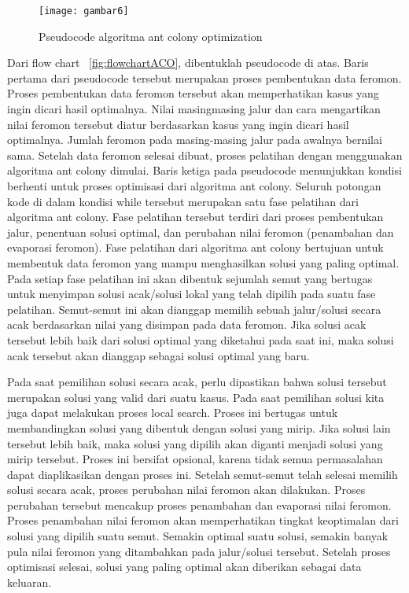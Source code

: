 \begin{itemize}
\begin{figure}[H]
	\centering
	\texttt{[image: gambar6]}
	\caption[Pseudocode ACO] {Pseudocode algoritma ant colony optimization}
	\label{fig:pseudocodeACO}
\end{figure}

Dari flow chart ~\ref{fig:flowchartACO}, dibentuklah pseudocode di atas. Baris pertama
dari pseudocode tersebut merupakan proses pembentukan data feromon. Proses pembentukan data
feromon tersebut akan memperhatikan kasus yang ingin dicari hasil optimalnya. Nilai masingmasing
jalur dan cara mengartikan nilai feromon tersebut diatur berdasarkan kasus yang ingin
dicari hasil optimalnya. Jumlah feromon pada masing-masing jalur pada awalnya bernilai sama.
Setelah data feromon selesai dibuat, proses pelatihan dengan menggunakan algoritma ant colony
dimulai. Baris ketiga pada pseudocode menunjukkan kondisi berhenti untuk proses optimisasi dari
algoritma ant colony. 
Seluruh potongan kode di dalam kondisi while tersebut merupakan satu fase
pelatihan dari algoritma ant colony. Fase pelatihan tersebut terdiri dari proses pembentukan jalur,
penentuan solusi optimal, dan perubahan nilai feromon (penambahan dan evaporasi feromon).
Fase pelatihan dari algoritma ant colony bertujuan untuk membentuk data feromon yang mampu
menghasilkan solusi yang paling optimal. Pada setiap fase pelatihan ini akan dibentuk sejumlah
semut yang bertugas untuk menyimpan solusi acak/solusi lokal yang telah dipilih pada suatu fase
pelatihan. Semut-semut ini akan dianggap memilih sebuah jalur/solusi secara acak berdasarkan
nilai yang disimpan pada data feromon. Jika solusi acak tersebut lebih baik dari solusi optimal
yang diketahui pada saat ini, maka solusi acak tersebut akan dianggap sebagai solusi optimal yang
baru.

Pada saat pemilihan solusi secara acak, perlu dipastikan bahwa solusi tersebut merupakan solusi
yang valid dari suatu kasus. Pada saat pemilihan solusi kita juga dapat melakukan proses local
search. Proses ini bertugas untuk membandingkan solusi yang dibentuk dengan solusi yang mirip.
Jika solusi lain tersebut lebih baik, maka solusi yang dipilih akan diganti menjadi solusi yang mirip
tersebut. Proses ini bersifat opsional, karena tidak semua permasalahan dapat diaplikasikan dengan
proses ini.
Setelah semut-semut telah selesai memilih solusi secara acak, proses perubahan nilai feromon
akan dilakukan. Proses perubahan tersebut mencakup proses penambahan dan evaporasi nilai
feromon. Proses penambahan nilai feromon akan memperhatikan tingkat keoptimalan dari solusi
yang dipilih suatu semut. Semakin optimal suatu solusi, semakin banyak pula nilai feromon yang
ditambahkan pada jalur/solusi tersebut. Setelah proses optimisasi selesai, solusi yang paling optimal
akan diberikan sebagai data keluaran.

\end{itemize}

